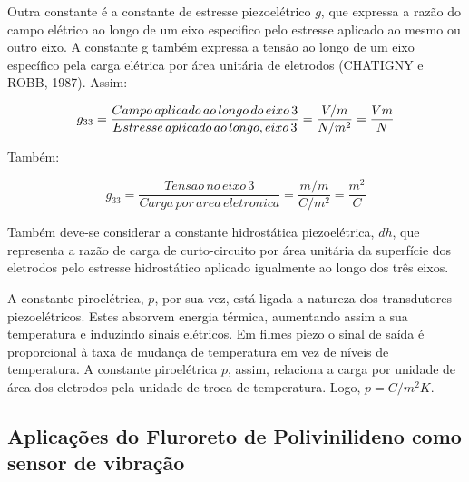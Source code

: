 \documentclass[
	12pt,				
	oneside,			
	a4paper,			
	english,			
	brazil,			
	]{abntex2ppgsi}
\begin{document}
Outra constante é a constante de estresse piezoelétrico $g$, que expressa a razão do campo elétrico ao longo de um eixo especifico pelo estresse aplicado ao mesmo ou outro eixo. A constante g também expressa a tensão ao longo de um eixo específico pela carga elétrica por área unitária de eletrodos (CHATIGNY e ROBB, 1987). Assim:

\begin{equation}
	g_{33} = \frac{Campo \,aplicado \,ao \,longo \,do \,eixo \,3}{Estresse \,aplicado \,ao \,longo ,\do \,eixo \,3} = \frac{V/m}{N/m^{2}} = \frac{Vm}{N}
	\label{eq: Constante G, expressando a razão do campo elétrico ao longo do eixo.}
\end{equation}


Também:

\begin{equation}
	g_{33} = \frac{Tensao \,no \,eixo \,3}{Carga \,por \,area \,eletronica} = \frac{m/m}{C/m^{2}} = \frac{m^{2}}{C}
	\label{eq: Contante G, expressando a tensão ao longo de um eixo específico pela carga elétrica por área unitária de eletrodos.}
\end{equation}


Também deve-se considerar a constante hidrostática piezoelétrica, $dh$, que representa a razão de carga de curto-circuito por área unitária da superfície dos eletrodos pelo estresse hidrostático aplicado igualmente ao longo dos três eixos. 

A constante piroelétrica, $p$, por sua vez, está ligada a natureza dos transdutores piezoelétricos. Estes absorvem energia térmica, aumentando assim a sua temperatura e induzindo sinais elétricos. Em filmes piezo o sinal de saída é proporcional à taxa de mudança de temperatura em vez de níveis de temperatura. A constante piroelétrica $p$, assim, relaciona a carga por unidade de área dos eletrodos pela unidade de troca de temperatura. Logo, $p = C/m^{2} K$.

\subsection{\textbf{Aplicações do Fluroreto de Polivinilideno como sensor de vibração}}
\end{document}
